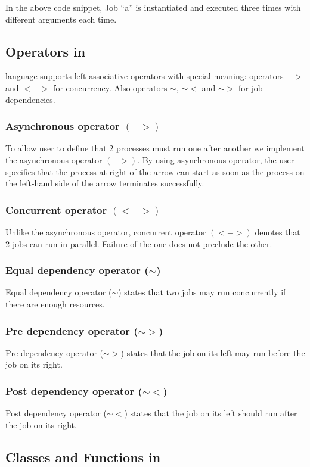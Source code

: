 In the above code snippet, Job ``a'' is instantiated and executed three times
with different arguments each time.



\subsection*{Operators in \lang{}}

\lang{} language supports left associative operators with special meaning:
operators $->$ and $<->$ for concurrency. 
Also operators $\sim$, $\sim<$ and $\sim>$ for job dependencies.
\subsubsection*{Asynchronous operator $(->)$}
To allow user to define that 2 processes must run one after another
we implement the asynchronous operator $(->)$. By using asynchronous operator,
the user specifies that the process at right of the arrow can start as soon as
the process on the left-hand side of the arrow terminates successfully.
\subsubsection*{Concurrent operator $(<->)$}
Unlike the asynchronous operator, concurrent operator $(<->)$ denotes that 2 jobs can
run in parallel. Failure of the one does not preclude the other.
\subsubsection*{Equal dependency operator ($\sim$)}
Equal dependency operator ($\sim$) states that two jobs may run concurrently if
there are enough resources.
\subsubsection*{Pre dependency operator ($\sim>$)}
Pre dependency operator ($\sim>$) states that the job on its left may run
before the job on its right.
\subsubsection*{Post dependency operator ($\sim<$)}
Post dependency operator ($\sim<$) states that the job on its left should run
after the job on its right.

\subsection*{Classes and Functions in \lang{}}
